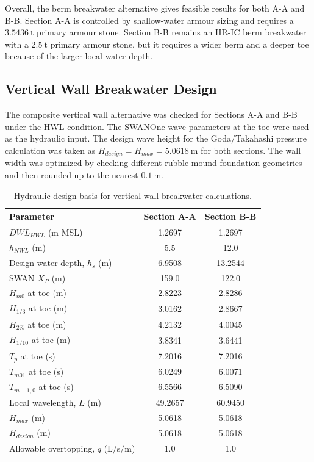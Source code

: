 \documentclass[a4paper, 11pt]{article}
\begin{document}
Overall, the berm breakwater alternative gives feasible results for both A-A and B-B. Section A-A is controlled by shallow-water armour sizing and requires a \(3.5436~\mathrm{t}\) primary armour stone. Section B-B remains an HR-IC berm breakwater with a \(2.5~\mathrm{t}\) primary armour stone, but it requires a wider berm and a deeper toe because of the larger local water depth.


\subsection{Vertical Wall Breakwater Design}

\hspace*{0.5cm} The composite vertical wall alternative was checked for Sections A-A and B-B under the HWL condition. The SWANOne wave parameters at the toe were used as the hydraulic input. The design wave height for the Goda/Takahashi pressure calculation was taken as \(H_{design}=H_{max}=5.0618~\mathrm{m}\) for both sections. The wall width was optimized by checking different rubble mound foundation geometries and then rounded up to the nearest \(0.1~\mathrm{m}\).

\begin{table}[H]
\centering
\caption{Hydraulic design basis for vertical wall breakwater calculations.}
\label{tab:vertical_hydraulic}
\begin{tabular}{l c c}
\hline
Parameter & Section A-A & Section B-B \\
\hline
\(DWL_{HWL}\) (m MSL) & 1.2697 & 1.2697 \\
\(h_{NWL}\) (m) & 5.5 & 12.0 \\
Design water depth, \(h_s\) (m) & 6.9508 & 13.2544 \\
SWAN \(X_P\) (m) & 159.0 & 122.0 \\
\(H_{m0}\) at toe (m) & 2.8223 & 2.8286 \\
\(H_{1/3}\) at toe (m) & 3.0162 & 2.8667 \\
\(H_{2\%}\) at toe (m) & 4.2132 & 4.0045 \\
\(H_{1/10}\) at toe (m) & 3.8341 & 3.6441 \\
\(T_p\) at toe (s) & 7.2016 & 7.2016 \\
\(T_{m01}\) at toe (s) & 6.0249 & 6.0071 \\
\(T_{m-1,0}\) at toe (s) & 6.5566 & 6.5090 \\
Local wavelength, \(L\) (m) & 49.2657 & 60.9450 \\
\(H_{max}\) (m) & 5.0618 & 5.0618 \\
\(H_{design}\) (m) & 5.0618 & 5.0618 \\
Allowable overtopping, \(q\) (L/s/m) & 1.0 & 1.0 \\
\hline
\end{tabular}
\end{table}
\end{document}

